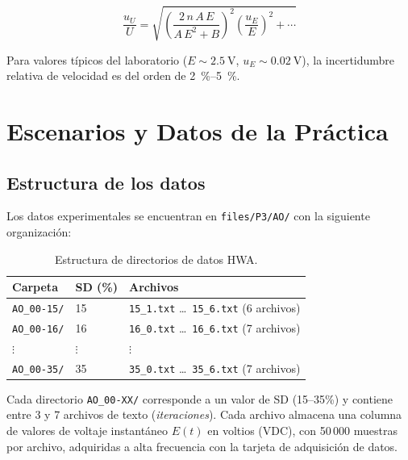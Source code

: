 \documentclass[12pt,a4paper]{article}
\begin{document}
\begin{equation}
	\frac{u_U}{U} = \sqrt{
		\left(\frac{2\,n\,A\,E}{A\,E^2 + B}\right)^2
		\left(\frac{u_E}{E}\right)^2
		+ \cdots
	}
	\label{eq:uU_relativa}
\end{equation}

Para valores típicos del laboratorio ($E \sim \SI{2.5}{\V}$,
$u_E \sim \SI{0.02}{\V}$), la incertidumbre relativa de velocidad es del
orden de \SI{2}{\percent}--\SI{5}{\percent}.

\section{Escenarios y Datos de la Práctica}
\label{sec:escenarios}

\subsection{Estructura de los datos}

Los datos experimentales se encuentran en \texttt{files/P3/AO/} con la
siguiente organización:

\begin{table}[H]
	\centering
	\caption{Estructura de directorios de datos HWA.}
	\label{tab:directorios}
	\begin{tabular}{lll}
		\toprule
		\textbf{Carpeta}    & \textbf{SD (\%)} & \textbf{Archivos}                                          \\
		\midrule
		\texttt{AO\_00-15/} & 15               & \texttt{15\_1.txt} \ldots\ \texttt{15\_6.txt} (6 archivos) \\
		\texttt{AO\_00-16/} & 16               & \texttt{16\_0.txt} \ldots\ \texttt{16\_6.txt} (7 archivos) \\
		$\vdots$            & $\vdots$         & $\vdots$                                                   \\
		\texttt{AO\_00-35/} & 35               & \texttt{35\_0.txt} \ldots\ \texttt{35\_6.txt} (7 archivos) \\
		\bottomrule
	\end{tabular}
\end{table}

Cada directorio \texttt{AO\_00-XX/} corresponde a un valor de SD (15--35\%)
y contiene entre 3 y 7 archivos de texto (\emph{iteraciones}).  Cada archivo
almacena una columna de valores de voltaje instantáneo $E(t)$ en voltios
(VDC), con 50\,000 muestras por archivo, adquiridas a alta frecuencia con la
tarjeta de adquisición de datos.
\end{document}
